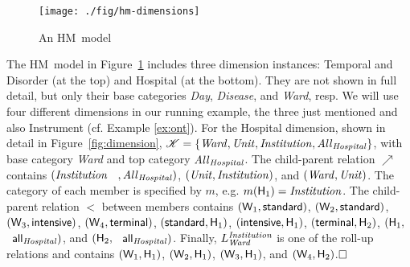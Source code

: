 \documentclass[format=acmsmall, review=false, screen=true]{acmart}
\newcommand{\boxtheorem}{\ensuremath{\hfill \Box}}
\newcommand{\mscr}[1]{\mathscr{ #1}}
\newcommand{\nit}[1]{{\it #1}}
\newcommand{\hm}{HM}
\newcommand{\red}[1]{{#1}}
\newcommand{\blue}[1]{{#1}}
\newcommand{\comlb}[1]{{\vspace{2mm}\noindent \bf \blue{COMM(LEO):}}~ #1 \hfill {\bf
    END.}\\}
\newcommand{\commos}[1]{{\vspace{2mm}\noindent \bf \blue{COMM(MOSTAFA):}}~ #1 \hfill {\bf
    END.}\\}
\begin{document}
\begin{figure}[ht]
\vspace{-4mm}
\begin{center}
\texttt{[image: ./fig/hm-dimensions]}
 \caption{An \hm \ model}\label{fig:hm-dimension}
 \end{center}
 \vspace{-5mm}
\end{figure}




\begin{example}\label{ex:dim} \red{The \hm \ model in Figure~\ref{fig:hm-dimension} includes three dimension instances: {\sf Temporal} and {\sf Disorder} (at the top) and {\sf Hospital} (at the bottom). They are not shown in full detail, but only their base categories \nit{Day}, \nit{Disease}, and \nit{Ward}, resp. We will use four different dimensions in our running example, the three just mentioned and also  {\sf Instrument} (cf. Example \ref{ex:ont}).} For the {\sf Hospital} dimension,  shown in detail in Figure~\ref{fig:dimension}, $\mscr{K}=\{\nit{Ward}, \nit{Unit}, \nit{Institution}, \nit{All}_\nit{Hospital}\}$, with base category \nit{Ward} and top category $\nit{All}_\nit{Hospital}$. The child-parent relation $\nearrow$ contains $(\nit{Institution}$ \ $,\nit{All}_\nit{Hospital})$, $(\nit{Unit},\nit{Institution})$, and $(\nit{Ward},\nit{Unit})$. The category of each member is specified by $m$, e.g. $m({\sf H}_1)=\nit{Institution}$. The child-parent relation $<$ between  members contains $({\sf W}_1, {\sf standard})$, $({\sf W}_2, {\sf standard})$, $({\sf W}_3, {\sf intensive})$, $({\sf W}_4, {\sf terminal})$, $({\sf standard}, {\sf H}_1)$, $({\sf intensive}, {\sf H}_1)$, $({\sf terminal}, {\sf H}_2)$, $({\sf H}_1,$ \ ${\sf all}_\nit{Hospital})$, and $({\sf H}_2,$ \ ${\sf all}_\nit{Hospital})$. Finally, $L_\nit{Ward}^\nit{Institution}$ is one of the roll-up relations and contains $({\sf W}_1,{\sf H}_1)$, $({\sf W}_2,{\sf H}_1)$, $({\sf W}_3,{\sf H}_1)$, and $({\sf W}_4,{\sf H}_2)$.\boxtheorem
\end{example}
\end{document}
